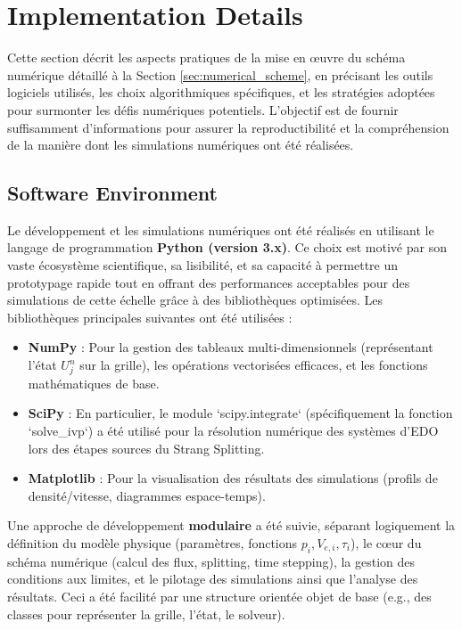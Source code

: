 \section{Implementation Details}
\label{sec:implementation_details}

Cette section décrit les aspects pratiques de la mise en œuvre du schéma numérique détaillé à la Section \ref{sec:numerical_scheme}, en précisant les outils logiciels utilisés, les choix algorithmiques spécifiques, et les stratégies adoptées pour surmonter les défis numériques potentiels. L'objectif est de fournir suffisamment d'informations pour assurer la reproductibilité et la compréhension de la manière dont les simulations numériques ont été réalisées.

\subsection{Software Environment}
\label{subsec:software}

Le développement et les simulations numériques ont été réalisés en utilisant le langage de programmation \textbf{Python (version 3.x)}. Ce choix est motivé par son vaste écosystème scientifique, sa lisibilité, et sa capacité à permettre un prototypage rapide tout en offrant des performances acceptables pour des simulations de cette échelle grâce à des bibliothèques optimisées. Les bibliothèques principales suivantes ont été utilisées :
\begin{itemize}
    \item \textbf{NumPy} \cite{Harris2020Numpy}: Pour la gestion des tableaux multi-dimensionnels (représentant l'état \(U_j^n\) sur la grille), les opérations vectorisées efficaces, et les fonctions mathématiques de base.
    \item \textbf{SciPy} \cite{Virtanen2020SciPy}: En particulier, le module `scipy.integrate` (spécifiquement la fonction `solve\_ivp`) a été utilisé pour la résolution numérique des systèmes d'EDO lors des étapes sources du Strang Splitting.
    \item \textbf{Matplotlib} \cite{Hunter2007Matplotlib}: Pour la visualisation des résultats des simulations (profils de densité/vitesse, diagrammes espace-temps).
\end{itemize}
Une approche de développement \textbf{modulaire} a été suivie, séparant logiquement la définition du modèle physique (paramètres, fonctions \(p_i, V_{e,i}, \tau_i\)), le cœur du schéma numérique (calcul des flux, splitting, time stepping), la gestion des conditions aux limites, et le pilotage des simulations ainsi que l'analyse des résultats. Ceci a été facilité par une structure orientée objet de base (e.g., des classes pour représenter la grille, l'état, le solveur).


